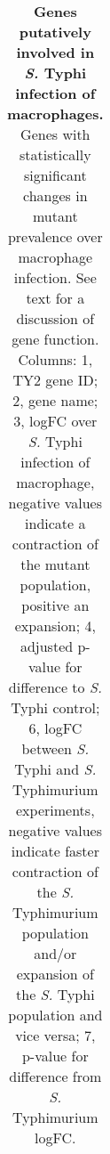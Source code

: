 %
\begin{table}
   \centering
   \noindent
    \caption[Genes putatively involved in \textit{S.} Typhi infection of macrophages]{\textbf{Genes putatively involved in \textit{S.} Typhi infection of macrophages.} Genes with statistically significant changes in mutant prevalence over macrophage infection. See text for a discussion of gene function.  Columns: 1, TY2 gene ID; 2, gene name; 3, logFC over {\it S.} Typhi infection of macrophage, negative values indicate a contraction of the mutant population, positive an expansion; 4, adjusted p-value for difference to {\it S.} Typhi control; 6, logFC between {\it S.} Typhi and {\it S.} Typhimurium experiments, negative values indicate faster contraction of the {\it S.} Typhimurium population and/or expansion of the {\it S.} Typhi population and vice versa; 7, p-value for difference from {\it S.} Typhimurium logFC. }
    \begin{tabular}{ l
    				l
				r
    				c
				r
				c
				}
   

\end{tabular}
\end{table}
